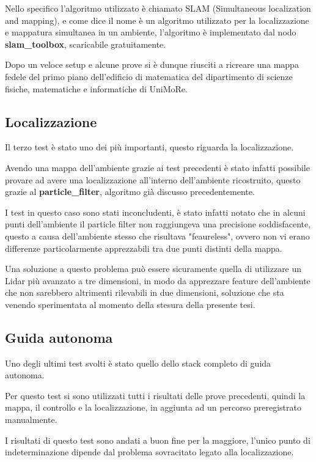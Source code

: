 \noindent Nello specifico l'algoritmo utilizzato è chiamato SLAM (Simultaneous localization and mapping), e come dice il nome è un algoritmo utilizzato per la localizzazione e mappatura simultanea in un ambiente, l'algoritmo è implementato dal nodo \textbf{slam\_toolbox}, scaricabile gratuitamente.

\noindent Dopo un veloce setup e alcune prove si è dunque riusciti a ricreare una mappa fedele del primo piano dell'edificio di matematica del dipartimento di scienze fisiche, matematiche e informatiche di UniMoRe.

\subsection{Localizzazione}
Il terzo test è stato uno dei più importanti, questo riguarda la localizzazione.

\noindent Avendo una mappa dell'ambiente grazie ai test precedenti è stato infatti possibile provare ad avere una localizzazione all'interno dell'ambiente ricostruito, questo grazie al \textbf{particle\_filter}, algoritmo già discusso precedentemente.

\noindent I test in questo caso sono stati inconcludenti, è stato infatti notato che in alcuni punti dell'ambiente il particle filter non raggiungeva una precisione soddisfacente, questo a causa dell'ambiente stesso che risultava "feaureless", ovvero non vi erano differenze particolarmente apprezzabili tra due punti distinti della mappa.

\noindent Una soluzione a questo problema può essere sicuramente quella di utilizzare un Lidar più avanzato a tre dimensioni, in modo da apprezzare feature dell'ambiente che non sarebbero altrimenti rilevabili in due dimensioni, soluzione che sta venendo sperimentata al momento della stesura della presente tesi.

\subsection{Guida autonoma}
Uno degli ultimi test svolti è stato quello dello stack completo di guida autonoma. 

\noindent Per questo test si sono utilizzati tutti i risultati delle prove precedenti, quindi la mappa, il controllo e la localizzazione, in aggiunta ad un percorso preregistrato manualmente.

\noindent I risultati di questo test sono andati a buon fine per la maggiore, l'unico punto di indeterminazione dipende dal problema sovracitato legato alla localizzazione.
